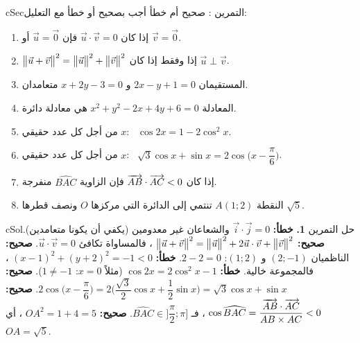 \documentclass[12pt,a4paper]{article}
\newenvironment{BOX}[2]{\begin{otherlanguage}{english}\begin{arbox}{#1}{#2}}{\end{arbox}\end{otherlanguage}}
\newcounter{exo}
\newenvironment{tamrin}[1]{\stepcounter{exo}\begin{BOX}{cSec}{التمرين \theexo: #1}}{\end{BOX}}
\newenvironment{hal}{\Needspace{12\baselineskip}\begin{otherlanguage}{english}\begin{arbox}[breakable]{cSol}{حل التمرين \theexo}}{\end{arbox}\end{otherlanguage}}
\begin{document}
\begin{tamrin}{صحيح أم خطأ}
أجب بصحيح أو خطأ مع التعليل:
\begin{enumerate}
\item إذا كان $\vec u\cdot\vec v=0$ فإن $\vec u=\vec0$ أو $\vec v=\vec0$.
\item $\big\|\vec u+\vec v\big\|^2=\big\|\vec u\big\|^2+\big\|\vec v\big\|^2$ إذا وفقط إذا كان $\vec u\perp\vec v$.
\item المستقيمان $2x-y+1=0$ و $x+2y-3=0$ متعامدان.
\item المعادلة $x^2+y^2-2x+4y+6=0$ هي معادلة دائرة.
\item من أجل كل عدد حقيقي $x$: \ $\cos2x=1-2\cos^2x$.
\item من أجل كل عدد حقيقي $x$: \ $\sqrt3\cos x+\sin x=2\cos\Big(x-\dfrac\pi6\Big)$.
\item إذا كان $\overrightarrow{AB}\cdot\overrightarrow{AC}<0$ فإن الزاوية $\widehat{BAC}$ منفرجة.
\item النقطة $A(1;2)$ تنتمي إلى الدائرة التي مركزها $O$ ونصف قطرها $\sqrt5$.
\end{enumerate}
\end{tamrin}
\begin{hal}
\textbf{1.} \textbf{خطأ:} $\vec i\cdot\vec j=0$ والشعاعان غير معدومين (يكفي أن يكونا متعامدين).
 \textbf{صحيح:} $\big\|\vec u+\vec v\big\|^2=\big\|\vec u\big\|^2+2\vec u\cdot\vec v+\big\|\vec v\big\|^2$ ، فالمساواة تكافئ $\vec u\cdot\vec v=0$.
 \textbf{صحيح:} الناظميان $(2;-1)$ و $(1;2)$: $2-2=0$.
 \textbf{خطأ:} $(x-1)^2+(y+2)^2=-1<0$ ، فالمجموعة خالية.
 \textbf{خطأ:} $\cos2x=2\cos^2x-1$ (مثلاً $x=0$: $1\ne-1$).
 \textbf{صحيح:} $2\cos\Big(x-\dfrac\pi6\Big)=2\Big(\dfrac{\sqrt3}2\cos x+\dfrac12\sin x\Big)=\sqrt3\cos x+\sin x$.
 \textbf{صحيح:} $\cos\widehat{BAC}=\dfrac{\overrightarrow{AB}\cdot\overrightarrow{AC}}{AB\times AC}<0$ ، فـ $\widehat{BAC}\in\Big]\dfrac\pi2;\pi\Big]$.
 \textbf{صحيح:} $OA^2=1+4=5$ ، أي $OA=\sqrt5$.
\end{hal}

\end{document}
